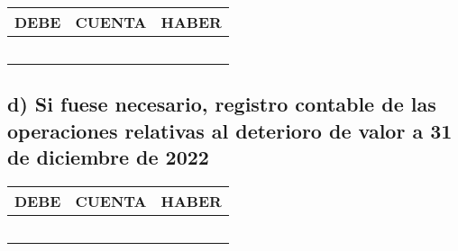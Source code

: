 \begin{table}[h!]
\centering
\begin{tabular}{|c|c|c|}
\hline
DEBE & CUENTA & HABER \\
\hline
 &  &  \\
 &  &  \\
 &  &  \\
 &  &  \\
 &  &  \\
\hline
\end{tabular}
\end{table}

\subsection*{d) Si fuese necesario, registro contable de las operaciones relativas al deterioro de valor a 31 de diciembre de 2022}

\begin{table}[h!]
\centering
\begin{tabular}{|c|c|c|}
\hline
DEBE & CUENTA & HABER \\
\hline
 &  &  \\
 &  &  \\
 &  &  \\
 &  &  \\
 &  &  \\
\hline
\end{tabular}
\end{table}